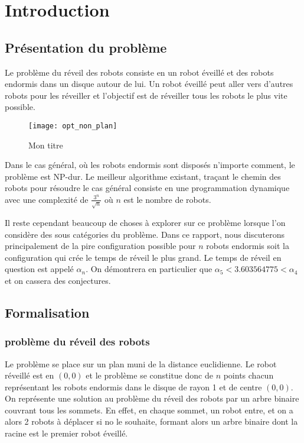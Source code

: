 \section{Introduction}

\subsection{Présentation du problème}

Le problème du réveil des robots consiste en un robot éveillé et des robots endormis dans un disque autour de lui. Un robot éveillé peut aller vers d'autres robots pour les réveiller et l'objectif est de réveiller tous les robots le plus vite possible.

\begin{figure}[h!]
  \centering
  \texttt{[image: opt\_non\_plan]}
  \caption{Mon titre}
  \label{fig:opt_non_plan}
\end{figure}

Dans le cas général, où les robots endormis sont disposés n'importe comment, le problème est NP-dur. Le meilleur algorithme existant, traçant le chemin des robots pour résoudre le cas général consiste en une programmation dynamique avec une complexité de $\frac{3^n}{\sqrt{n}}$ où $n$ est le nombre de robots.

Il reste cependant beaucoup de choses à explorer sur ce problème lorsque l'on considère des sous catégories du problème. Dans ce rapport, nous discuterons principalement de la pire configuration possible pour $n$ robots endormis soit la configuration qui crée le temps de réveil le plus grand. Le temps de réveil en question est appelé $\alpha_n$. On démontrera en particulier que $\alpha_5 < 3.603564775 < \alpha_4$ et on cassera des conjectures.

\subsection{Formalisation}

\subsubsection{problème du réveil des robots}

Le problème se place sur un plan muni de la distance euclidienne. Le robot réveillé est en $(0,0)$ et le problème se constitue donc de $n$ points chacun représentant les robots endormis dans le disque de rayon 1 et de centre $(0,0)$. On représente une solution au problème du réveil des robots par un arbre binaire couvrant tous les sommets. En effet, en chaque sommet, un robot entre, et on a alors 2 robots à déplacer si no le souhaite, formant alors un arbre binaire dont la racine est le premier robot éveillé.

